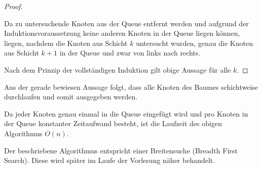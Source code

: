 \documentclass[11pt,a4paper]{article}
\begin{document}
\begin{loesung}
\begin{enumerate}
\begin{proof}
\begin{description}
                Da zu untersuchende Knoten aus der Queue entfernt werden und aufgrund der Induktionsvoraussetzung keine anderen Knoten in der Queue liegen können, liegen, nachdem die Knoten aus Schicht $k$ untersucht wurden, genau die Knoten aus Schicht $k + 1$ in der Queue und zwar von links nach rechts.
            \end{description}
            Nach dem Prinzip der vollständigen Induktion gilt obige Aussage für alle $k$.
        \end{proof}
        Aus der gerade bewiesen Aussage folgt, dass alle Knoten des Baumes schichtweise durchlaufen und somit ausgegeben werden.

        Da jeder Knoten genau einmal in die Queue eingefügt wird und pro Knoten in der Queue konstanter Zeitaufwand besteht, ist die Laufzeit des obigen Algorithmus $O(n)$.

        Der beschriebene Algorithmus entspricht einer Breitensuche (Breadth First Search).
        Diese wird später im Laufe der Vorlesung näher behandelt.


\end{enumerate}
\end{loesung}
\end{document}
